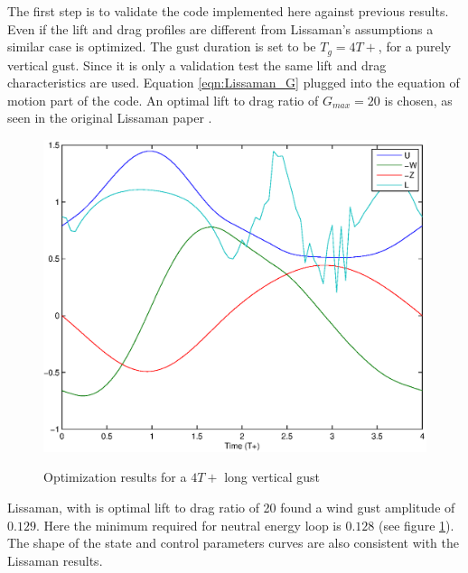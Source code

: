 \label{sec:results}


\par The first step is to validate the code implemented here against previous results. 
Even if the lift and drag profiles are different from Lissaman's assumptions a similar case is optimized.
The gust duration is set to be $T_g=4 T+$, for a purely vertical gust.
Since it is only a validation test the same lift and drag characteristics are used. Equation \ref{eqn:Lissaman_G} plugged into the equation of motion part of the code. An optimal lift to drag ratio of $G_{max}=20$ is chosen, as seen in the original Lissaman paper \cite{Lissaman2007neutral}.

\begin{figure}[ht]
	\begin{center}	
	\scalebox{0.8}
	{\includegraphics{./Figures/Windtype=1_Tg=4_Wg=0p129_quad_G=20.eps}}
	\end{center}
	\caption{Optimization results for a $4T+$ long vertical gust}
	\label{fig:Validation_optimization}
\end{figure}

\FloatBarrier

Lissaman, with is optimal lift to drag ratio of 20 found a wind gust amplitude of $0.129$. 
Here the minimum required for neutral energy loop is $0.128$ (see figure \ref{fig:Validation_optimization}).
The shape of the state and control parameters curves are also consistent with the Lissaman results.


